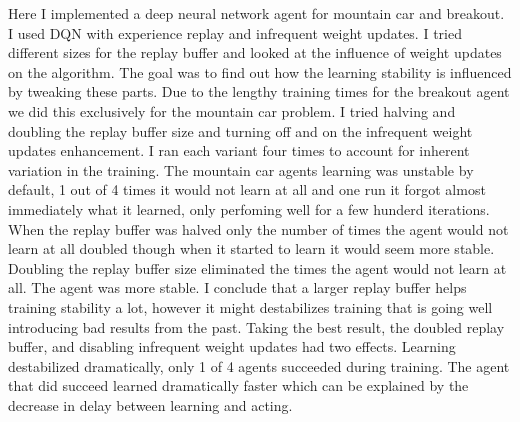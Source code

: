 
Here I implemented a deep neural network agent for mountain car and breakout. I used DQN with experience replay and infrequent weight updates. I tried different sizes for the replay buffer and looked at the influence of weight updates on the algorithm. %
%
The goal was to find out how the learning stability is influenced by tweaking these parts. Due to the lengthy training times for the breakout agent we did this exclusively for the mountain car problem. I tried halving and doubling the replay buffer size and turning off and on the infrequent weight updates enhancement. I ran each variant four times to account for inherent variation in the training.
%
The mountain car agents learning was unstable by default, 1 out of 4 times it would not learn at all and one run it forgot almost immediately what it learned, only perfoming well for a few hunderd iterations. When the replay buffer was halved only the number of times the agent would not learn at all doubled though when it started to learn it would seem more stable. Doubling the replay buffer size eliminated the times the agent would not learn at all. The agent was more stable. I conclude that a larger replay buffer helps training stability a lot, however it might destabilizes training that is going well introducing bad results from the past. Taking the best result, the doubled replay buffer, and disabling infrequent weight updates had two effects. Learning destabilized dramatically, only 1 of 4 agents succeeded during training. The agent that did succeed learned dramatically faster which can be explained by the decrease in delay between learning and acting.

